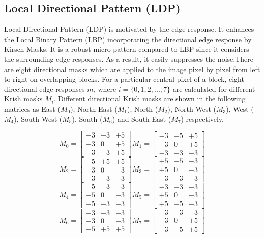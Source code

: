 \documentclass[conference]{IEEEtran}
\begin{document}
\subsection{Local Directional Pattern (LDP)}
Local Directional Pattern (LDP) \cite{2010LDP} is motivated by the edge response. It enhances the Local Binary Pattern (LBP) \cite{2002LBP} incorporating the directional edge response by Kirsch Masks. It is a robust micro-pattern compared to LBP \cite{2002LBP} since it considers the surrounding edge responses. As a result, it easily suppresses the noise.There are eight directional masks which are applied to the image pixel by pixel from left to right on overlapping blocks. For a particular central pixel of a block, eight directional edge responses $m_i$ where $i = \{0, 1, 2,...,7\}$ are calculated for different Krish masks $M_i$. Different directional Krish masks are shown in the following matrices as East ($M_0$), North-East ($M_1$), North ($M_2$), North-West ($M_3$), West ($M_4$), South-West ($M_5$), South ($M_6$) and South-East ($M_7$) respectively.

\begin{center}
	\[
	M_0 = 
	\begin{bmatrix}
	-3 & -3 & +5 \\
	-3 & 0 & +5 \\
	-3 & -3 & +5
	\end{bmatrix}
	M_1 = 
	\begin{bmatrix}
	-3 & +5 & +5 \\
	-3 & 0 & +5 \\
	-3 & -3 & -3
	\end{bmatrix}
	\]
	\[
	M_2 = 
	\begin{bmatrix}
	+5 & +5 & +5 \\
	-3 & 0 & -3 \\
	-3 & -3 & -3
	\end{bmatrix}
	M_3 = 
	\begin{bmatrix}
	+5 & +5 & -3 \\
	+5 & 0 & -3 \\
	-3 & -3 & -3
	\end{bmatrix}
	\]
	\[
	M_4 = 
	\begin{bmatrix}
	+5 & -3 & -3 \\
	+5 & 0 & -3 \\
	+5 & -3 & -3
	\end{bmatrix}
	M_5 = 
	\begin{bmatrix}
	-3 & -3 & -3 \\
	+5 & 0 & -3 \\
	+5 & +5 & -3
	\end{bmatrix}
	\]
	\[
	M_6 = 
	\begin{bmatrix}
	-3 & -3 & -3 \\
	-3 & 0 & -3 \\
	+5 & +5 & +5
	\end{bmatrix}
	M_7 = 
	\begin{bmatrix}
	-3 & -3 & -3 \\
	-3 & 0 & +5 \\
	-3 & +5 & +5
	\end{bmatrix}
	\]
	
\end{center}
\end{document}
